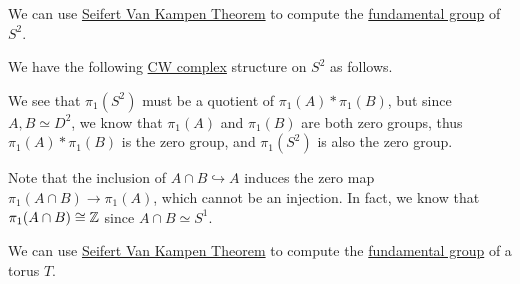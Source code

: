 \begin{eg}
	We can use \hyperref[thm:Seifert-Van-Kampen-Theorem]{Seifert Van Kampen Theorem} to compute the \hyperref[def:fundamental-group]{fundamental group}
	of \(S^{2}\).
\end{eg}
\begin{explanation}
	We have the following \hyperref[def:CW-Complex]{CW complex} structure on \(S^2\) as follows.
	\begin{figure}[H]
		\centering
		\label{fig:lec11-eg:2-sphere}
	\end{figure}
	We see that \(\pi _1(S^{2} )\) must be a quotient of \(\pi _1(A)\ast \pi _1(B)\), but since \(A, B\simeq D^{2} \), we know that
	\(\pi _1(A)\) and \(\pi _1(B)\) are both zero groups, thus \(\pi _1(A)\ast \pi _1(B)\) is the zero group, and \(\pi _1(S^{2} )\) is
	also the zero group.
	\begin{remark}
		Note that the inclusion of \(A\cap B\hookrightarrow A\) induces the zero map \(\pi _1(A\cap B)\to \pi _1(A)\), which cannot be an injection.
		In fact, we know that \(\pi _1(A\cap B)\cong \mathbb{\MakeUppercase{z}} \) since \(A\cap B\simeq S^1\).
	\end{remark}
\end{explanation}
\begin{eg}\label{lec11:eg:torus}
	We can use \hyperref[thm:Seifert-Van-Kampen-Theorem]{Seifert Van Kampen Theorem} to compute the \hyperref[def:fundamental-group]{fundamental group}
	of a torus \(T\).
\end{eg}
